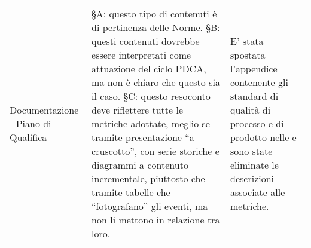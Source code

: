 \begin{longtable}{ 
				>{\centering}p{} 
				>{\centering}p{}
				>{\centering\arraybackslash}p{}}
				Documentazione - Piano di Qualifica
					&
				§A: questo tipo di contenuti è di pertinenza delle Norme. §B: questi contenuti dovrebbe essere interpretati come attuazione del ciclo PDCA, ma non è chiaro che questo sia il caso. §C: questo resoconto deve riflettere tutte le metriche adottate, meglio se tramite presentazione “a cruscotto”, con serie storiche e diagrammi a contenuto incrementale, piuttosto che tramite tabelle che “fotografano” gli eventi, ma non li mettono in relazione tra loro.
					&
				E' stata spostata l’appendice contenente gli standard di qualità di processo e di prodotto nelle \NdP{} e sono state eliminate le descrizioni associate alle metriche.
					\\

			\end{longtable}
		
